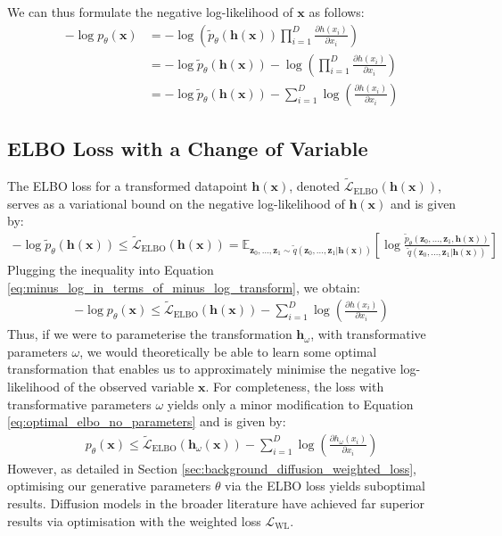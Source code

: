 \documentclass[ oneside,%
                    author={George Herbert},
                    degree={MSci},
                     title={Video Diffusion Models for Climate Simulations},
                  subtitle={}]{dissertation}
\begin{document}
We can thus formulate the negative log-likelihood of $\mathbf{x}$ as follows:
\begin{align}
      -\log p_\theta(\mathbf{x}) &= -\log \left(\tilde{p}_\theta(\mathbf{h}(\mathbf{x}))\prod_{i=1}^D\frac{\partial h(x_i)}{\partial x_i}\right)\\
      &= -\log \tilde{p}_\theta(\mathbf{h}(\mathbf{x})) - \log\left(\prod_{i=1}^D\frac{\partial h(x_i)}{\partial x_i}\right)\\
      &= -\log \tilde{p}_\theta(\mathbf{h}(\mathbf{x})) - \sum_{i=1}^D \log \left(\frac{\partial h(x_i)}{\partial x_i}\right)\label{eq:minus_log_in_terms_of_minus_log_transform}
\end{align}

\subsection{ELBO Loss with a Change of Variable}
\label{sec:results_elbo_change_of_variable}

The ELBO loss for a transformed datapoint $\mathbf{h}(\mathbf{x})$, denoted $\tilde{\mathcal{L}}_{\mathrm{ELBO}}(\mathbf{h}(\mathbf{x}))$, serves as a variational bound on the negative log-likelihood of $\mathbf{h}(\mathbf{x})$ and is given by:
\begin{align}
      -\log \tilde{p}_\theta(\mathbf{h}(\mathbf{x}))\le \tilde{\mathcal{L}}_{\mathrm{ELBO}}(\mathbf{h}(\mathbf{x})) = \mathbb{E}_{\mathbf{z}_0,\ldots,\mathbf{z}_1\sim\tilde{q}(\mathbf{z}_0,\ldots,\mathbf{z}_1|\mathbf{h}(\mathbf{x}))} \left[\log \frac{\tilde{p}_\theta(\mathbf{z}_0,\ldots,\mathbf{z}_1,\mathbf{h}(\mathbf{x}))}{\tilde{q}(\mathbf{z}_0,\ldots,\mathbf{z}_1|\mathbf{h}(\mathbf{x}))}\right]
\end{align}
Plugging the inequality into Equation \ref{eq:minus_log_in_terms_of_minus_log_transform}, we obtain:
\begin{align}
      -\log p_\theta(\mathbf{x})\le \tilde{\mathcal{L}}_{\mathrm{ELBO}}(\mathbf{h}(\mathbf{x})) - \sum_{i=1}^D \log \left(\frac{\partial h(x_i)}{\partial x_i}\right)\label{eq:optimal_elbo_no_parameters}
\end{align}
Thus, if we were to parameterise the transformation $\mathbf{h}_\omega$, with transformative parameters $\omega$, we would theoretically be able to learn some optimal transformation that enables us to approximately minimise the negative log-likelihood of the observed variable $\mathbf{x}$. For completeness, the loss with transformative parameters $\omega$ yields only a minor modification to Equation \ref{eq:optimal_elbo_no_parameters} and is given by:
\begin{align}
      p_\theta(\mathbf{x}) \le \tilde{\mathcal{L}}_{\mathrm{ELBO}}(\mathbf{h}_\omega(\mathbf{x})) - \sum_{i=1}^D \log \left(\frac{\partial h_\omega(x_i)}{\partial x_i}\right)\label{eq:optimal_elbo_parameters}
\end{align}
However, as detailed in Section \ref{sec:background_diffusion_weighted_loss}, optimising our generative parameters $\theta$ via the ELBO loss yields suboptimal results. Diffusion models in the broader literature have achieved far superior results via optimisation with the weighted loss $\mathcal{L}_{\mathrm{WL}}$.
\end{document}
